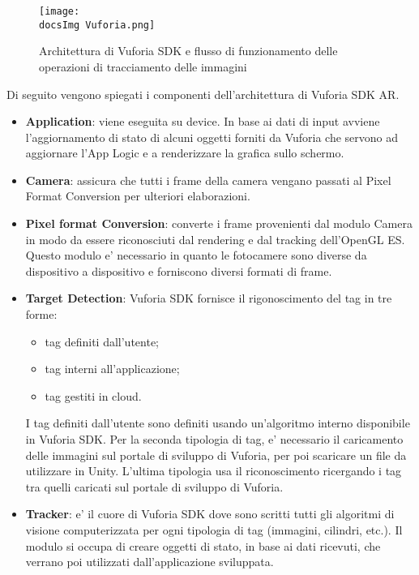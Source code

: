 \begin{figure}[H]
	\centering
	\texttt{[image: \\docsImg Vuforia.png]}
	\caption{Architettura di Vuforia SDK e flusso di funzionamento delle operazioni di tracciamento delle immagini}
	\label{fig:Architettura di Vuforia SDK e flusso di funzionamento delle operazioni di tracciamento delle immagini
	}
\end{figure}

Di seguito vengono spiegati i componenti dell'architettura di Vuforia SDK AR.

\begin{itemize}
	\item \textbf{Application}: viene eseguita su device. In base ai dati di input avviene l'aggiornamento di stato di alcuni oggetti forniti da Vuforia che servono ad aggiornare l'App Logic e a renderizzare la grafica sullo schermo.
	\item  \textbf{Camera}: assicura che tutti i frame della camera vengano passati al Pixel Format Conversion per ulteriori elaborazioni.
	\item \textbf{Pixel format Conversion}: converte i frame provenienti dal modulo Camera in modo da essere riconosciuti dal rendering e dal tracking dell'OpenGL ES. Questo modulo e' necessario in quanto le fotocamere sono diverse da dispositivo a dispositivo e forniscono diversi formati di frame.
	\item \textbf{Target Detection}: Vuforia SDK fornisce il rigonoscimento del tag in tre forme:
	\begin{itemize}
		\item tag definiti dall'utente;
		\item tag interni all'applicazione;
		\item tag gestiti in cloud.
	\end{itemize} 
	I tag definiti dall'utente sono definiti usando un'algoritmo interno disponibile in Vuforia SDK. Per la seconda tipologia di tag, e' necessario il caricamento delle immagini sul portale di sviluppo di Vuforia, per poi scaricare un file da utilizzare in Unity. L'ultima tipologia usa il riconoscimento ricergando i tag tra quelli caricati sul portale di sviluppo di Vuforia.
	\item \textbf{Tracker}: e' il cuore di Vuforia SDK dove sono scritti tutti gli algoritmi di visione computerizzata per ogni tipologia di tag (immagini, cilindri, etc.). Il modulo si occupa di creare oggetti di stato, in base ai dati ricevuti, che verrano poi utilizzati dall'applicazione sviluppata.
\end{itemize}



